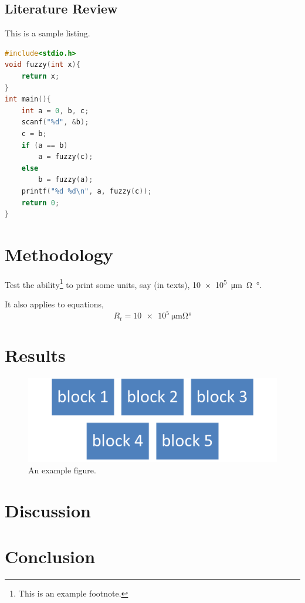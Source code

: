 \documentclass{senior-design}
\begin{document}
\section{Literature Review}
This is a sample listing.
\begin{lstlisting}[language=c]
#include<stdio.h>
void fuzzy(int x){
    return x;
}
int main(){
    int a = 0, b, c;
    scanf("%d", &b);
    c = b;
    if (a == b)
        a = fuzzy(c);
    else
        b = fuzzy(a);
    printf("%d %d\n", a, fuzzy(c));
    return 0;
}
\end{lstlisting}

\chapter{Methodology}

Test the ability\footnote{This is an example footnote.} to print some units, say (in texts), \SI{10e5}{\um\ohm\degree}.

It also applies to equations,
\begin{equation}
    R_{t}=\SI{10e5}{\um\ohm\degree}
\end{equation}

\chapter{Results}
\begin{figure}[H]
    \centering
    \includegraphics[width=0.8\linewidth]{figs/Picture1.png}
    \caption{An example figure.}
\end{figure}
\chapter{Discussion}

\chapter{Conclusion}

\end{document}

